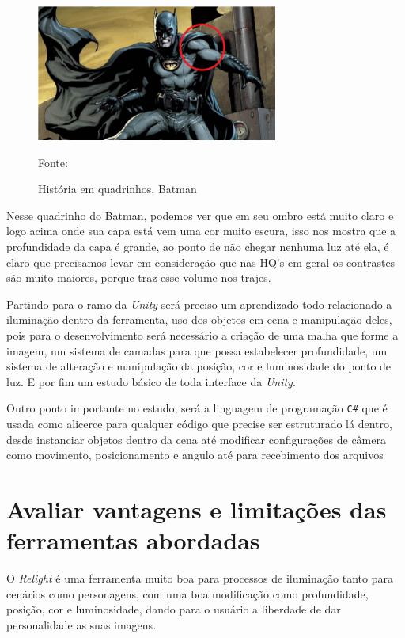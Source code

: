 \begin{figure}[ht]
    \caption{História em quadrinhos, Batman}
    \centering
    \includegraphics{imagens/batman.png}

    Fonte: \cite{Bazela2022-yg}
    \label{fig:batman}
\end{figure}

Nesse quadrinho do Batman, podemos ver que em seu ombro está muito claro e logo acima onde sua capa está vem uma cor muito escura, isso nos mostra que a profundidade da capa é grande, ao ponto de não chegar nenhuma luz até ela, é claro que precisamos levar em consideração que nas HQ’s em geral os contrastes são muito maiores, porque traz esse volume nos trajes. 

Partindo para o ramo da \textit{Unity} será preciso um aprendizado todo relacionado a iluminação dentro da ferramenta, uso dos objetos em cena e manipulação deles, pois para o desenvolvimento será necessário a criação de uma malha que forme a imagem, um sistema de camadas para que possa estabelecer profundidade, um sistema de alteração e manipulação da posição, cor e luminosidade do ponto de luz. E por fim um estudo básico de toda interface da \textit{Unity}.

Outro ponto importante no estudo, será a linguagem de programação \texttt{C\#} que é usada como alicerce para qualquer código que precise ser estruturado lá dentro, desde instanciar objetos dentro da cena até modificar configurações de câmera como movimento, posicionamento e angulo até para recebimento dos arquivos

\section{Avaliar vantagens e limitações das ferramentas abordadas}

O \textit{Relight} é uma ferramenta muito boa para processos de iluminação tanto para cenários como personagens, com uma boa modificação como profundidade, posição, cor e luminosidade, dando para o usuário a liberdade de dar personalidade as suas imagens.

